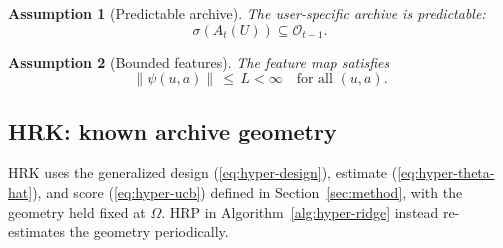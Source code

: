 \documentclass{article} %
\newtheorem{assumption}{Assumption}
\renewcommand{\eqref}[1]{\textup{(\ref{#1})}}
\begin{document}
\begin{assumption}[Predictable archive]
\label{ass:predictable}
The user-specific archive is predictable:
\begin{equation}
\label{eq:ass-pred}
\sigma(A_t(U)) \subseteq \mathcal{O}_{t-1}.
\end{equation}
\end{assumption}

\begin{assumption}[Bounded features]
\label{ass:bounded-feat}
The feature map satisfies
\begin{equation}
\label{eq:ass-feat}
\|\psi(u,a)\| \,\le\, L < \infty \quad \text{for all } (u,a).
\end{equation}
\end{assumption}

\subsection{HRK: known archive geometry}

HRK uses the generalized design
\eqref{eq:hyper-design}, estimate \eqref{eq:hyper-theta-hat}, and score
\eqref{eq:hyper-ucb} defined in Section~\ref{sec:method}, with the geometry
held fixed at \(\Omega\). HRP in Algorithm~\ref{alg:hyper-ridge}
instead re-estimates the geometry periodically.
\end{document}
